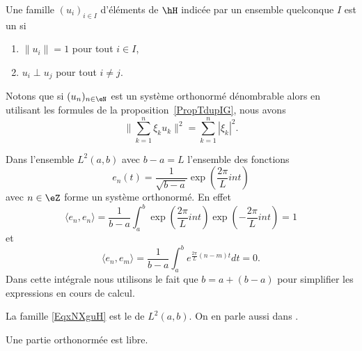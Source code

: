 \begin{definition}
	Une famille \( (u_i)_{i\in I}\) d'éléments de \( \hH\) indicée par un ensemble quelconque \( I\) est un 
	 si
	\begin{enumerate}
		\item
		      \( \| u_i \|=1\) pour tout \( i\in I\),
		\item
		      \( u_i\perp u_j\) pour tout \( i\neq j\).
	\end{enumerate}
\end{definition}
Notons que si \( (u_n)_{n\in \eN}\) est un système orthonormé dénombrable alors en utilisant les formules de la proposition~\ref{PropTdupIG}, nous avons
\begin{equation}    \label{EqCLQbMy}
	\big\| \sum_{k=1}^n\xi_ku_k \big\|^2=\sum_{k=1}^n| \xi_k |^2.
\end{equation}

\begin{example}
	Dans l'ensemble \( L^2(a,b)\) avec \( b-a=L\) l'ensemble des fonctions
	\begin{equation}        \label{EqxNXguH}
		e_n(t)=\frac{1}{ \sqrt{b-a} }\exp(\frac{ 2\pi }{ L }int)
	\end{equation}
	avec \( n\in \eZ\) forme un système orthonormé. En effet
	\begin{equation}
		\langle e_n, e_n\rangle =\frac{1}{ b-a }\int_a^b\exp(\frac{ 2\pi }{ L }int)\exp(-\frac{ 2\pi }{ L }int)=1
	\end{equation}
	et
	\begin{equation}
		\langle e_n, e_m\rangle =\frac{1}{ b-a }\int_a^b e^{\frac{ 2\pi }{ L }(n-m)t}dt=0.
	\end{equation}
	Dans cette intégrale nous utilisons le fait que \( b=a+(b-a)\) pour simplifier les expressions en cours de calcul.

	La famille \eqref{EqxNXguH} est le  de \( L^2(a,b)\). On en parle aussi dans \cite{KuttlerTopInAl}.
\end{example}

\begin{proposition}     \label{PROPooMOQRooCPFnPC}
	Une partie orthonormée est libre.
\end{proposition}

